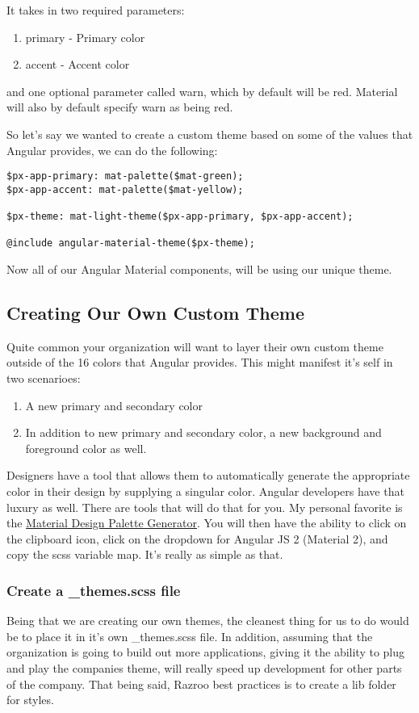 It takes in two required parameters: 
\begin{enumerate}
  \item primary - Primary color
  \item accent - Accent color 
\end{enumerate}
and one optional parameter called warn, which by default will be red. Material 
will also by default specify warn as being red. 

So let's say we wanted to create a custom theme based on some of the values 
that Angular provides, we can do the following: 

\begin{lstlisting}
$px-app-primary: mat-palette($mat-green);
$px-app-accent: mat-palette($mat-yellow);

$px-theme: mat-light-theme($px-app-primary, $px-app-accent);

@include angular-material-theme($px-theme);
\end{lstlisting}

Now all of our Angular Material components, will be using our unique theme.

\subsection{Creating Our Own Custom Theme}
Quite common your organization will want to layer their own custom theme 
outside of the 16 colors that Angular provides. This might manifest it's 
self in two scenarioes: 
\begin{enumerate}
  \item A new primary and secondary color
  \item In addition to new primary and secondary color, a new background and 
  foreground color as well. 
\end{enumerate}

Designers have a tool that allows them to automatically generate the appropriate
color in their design by supplying a singular color. Angular developers have
that luxury as well. There are tools that will do that for you. My personal 
favorite is the \href{http://mcg.mbitson.com}{Material Design Palette Generator}.
You will then have the ability to click on the clipboard icon, click on the 
dropdown for Angular JS 2 (Material 2), and copy the scss variable map. It's 
really as simple as that. 

\subsubsection{Create a \_themes.scss file}
Being that we are creating our own themes, the cleanest thing for us to do would 
be to place it in it's own \_themes.scss file. In addition, assuming that the 
organization is going to build out more applications, giving it the ability to
plug and play the companies theme, will really speed up development for other
parts of the company. That being said, Razroo best practices is to create a lib
folder for styles.

